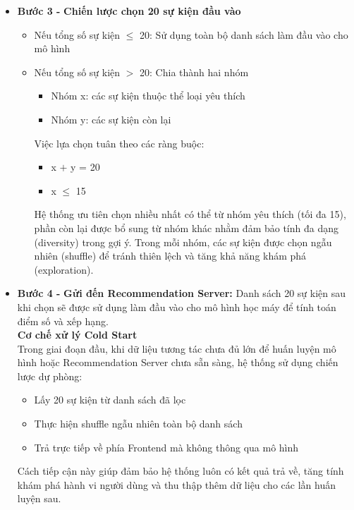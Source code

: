 \begin{itemize}
    \item[] \textbf{Bước 3 -} \textbf{Chiến lược chọn 20 sự kiện đầu vào}
    \begin{itemize}
        \item[-] Nếu tổng số sự kiện $\le$ 20: Sử dụng toàn bộ danh sách làm đầu vào cho mô hình
        \item[-] Nếu tổng số sự kiện $>$ 20: Chia thành hai nhóm
        \begin{itemize}
            \item[+] Nhóm x: các sự kiện thuộc thể loại yêu thích
            \item[+] Nhóm y: các sự kiện còn lại
        \end{itemize}
       Việc lựa chọn tuân theo các ràng buộc:
       \begin{itemize}
            \item[1.] x $+$ y = 20
            \item[2.] x $\le$ 15
       \end{itemize}
       Hệ thống ưu tiên chọn nhiều nhất có thể từ nhóm yêu thích (tối đa 15), phần còn lại được bổ sung từ nhóm khác nhằm đảm bảo tính đa dạng (diversity) trong gợi ý.
       Trong mỗi nhóm, các sự kiện được chọn ngẫu nhiên (shuffle) để tránh thiên lệch và tăng khả năng khám phá (exploration).
    \end{itemize}
    \item[] \textbf{Bước 4 -} \textbf{Gửi đến Recommendation Server:}
    Danh sách 20 sự kiện sau khi chọn sẽ được sử dụng làm đầu vào cho mô hình học máy để tính toán điểm số và xếp hạng.\\
    \textbf{Cơ chế xử lý Cold Start}\\
    Trong giai đoạn đầu, khi dữ liệu tương tác chưa đủ lớn để huấn luyện mô hình hoặc Recommendation Server chưa sẵn sàng, hệ thống sử dụng chiến lược dự phòng:
    \begin{itemize}
        \item[-] Lấy 20 sự kiện từ danh sách đã lọc
        \item[-] Thực hiện shuffle ngẫu nhiên toàn bộ danh sách
        \item[-] Trả trực tiếp về phía Frontend mà không thông qua mô hình
    \end{itemize}
    Cách tiếp cận này giúp đảm bảo hệ thống luôn có kết quả trả về, tăng tính khám phá hành vi người dùng và thu thập thêm dữ liệu cho các lần huấn luyện sau.

\end{itemize}

